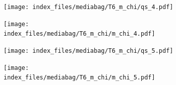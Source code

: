 \documentclass[
  11pt,
  letterpaper,
]{scrreprt}
\begin{document}
\begin{figure}

\begin{minipage}{0.50\linewidth}

\begin{figure}[H]

{\centering \texttt{[image: index\_files/mediabag/T6\_m\_chi/qs\_4.pdf]}

}


\end{figure}%

\end{minipage}%
%
\begin{minipage}{0.50\linewidth}

\begin{figure}[H]

{\centering \texttt{[image: index\_files/mediabag/T6\_m\_chi/m\_chi\_4.pdf]}

}


\end{figure}%

\end{minipage}%

\end{figure}%

\begin{figure}

\begin{minipage}{0.50\linewidth}

\begin{figure}[H]

{\centering \texttt{[image: index\_files/mediabag/T6\_m\_chi/qs\_5.pdf]}

}


\end{figure}%

\end{minipage}%
%
\begin{minipage}{0.50\linewidth}

\begin{figure}[H]

{\centering \texttt{[image: index\_files/mediabag/T6\_m\_chi/m\_chi\_5.pdf]}

}


\end{figure}%

\end{minipage}%

\end{figure}%
\end{document}
